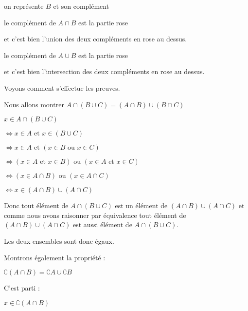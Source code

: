 \change

on représente $B$ et son complément

\change

le complément de $A \cap B$ est la partie rose

et c'est bien l'union des deux compléments en rose au dessus.

\change


le complément de $A \cup B$ est la partie rose

et c'est bien l'intersection des deux compléments en rose au dessus.


\diapo

Voyons comment s'effectue les preuves.

Nous allons montrer $A \cap (B \cup C) = (A \cap B) \cup (B \cap C)$

\change

$x \in A \cap (B \cup C)$ 

\change

$\iff x \in A \text{ et } x \in (B \cup C)$ 

\change

$\iff  x \in A \text{ et } (x \in B \text{ ou } x \in C)$ 

\change

$\iff (x \in A \text{ et } x\in B) \text{ ou } (x \in A \text{ et } x \in C)$ 

\change

$\iff (x \in A \cap B) \text{ ou } (x \in A \cap C)$

\change

$\iff x \in (A\cap B) \cup (A\cap C)$


Donc tout élément de $A \cap (B \cup C)$ est un élément de $(A\cap B) \cup (A\cap C)$
et comme nous avons raisonner par équivalence tout élément de $(A\cap B) \cup (A\cap C)$
est aussi élément de $A \cap (B \cup C)$.

Les deux ensembles sont donc égaux.


\diapo

Montrons également la propriété : 

$\complement \left( A \cap B \right) = \complement A \cup \complement B$

\change

C'est parti :

$x \in \complement \left( A \cap B \right)$ 

\change

